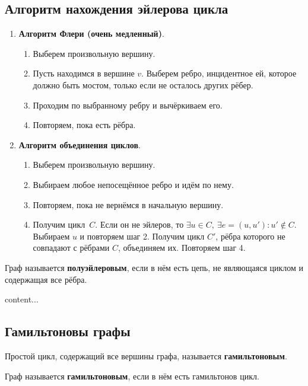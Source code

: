 \subsection{Алгоритм нахождения эйлерова цикла}
\begin{enumerate}
\item \textbf{Алгоритм Флери (очень медленный)}.
\begin{enumerate}
	\item Выберем произвольную вершину.
	\item Пусть находимся в вершине $v$. Выберем ребро, инцидентное ей, которое должно быть мостом, только если не осталось других рёбер.
	\item Проходим по выбранному ребру и вычёркиваем его.
	\item Повторяем, пока есть рёбра.
\end{enumerate}
\item \textbf{Алгоритм объединения циклов}.
\begin{enumerate}
	\item Выберем произвольную вершину.
	\item Выбираем любое непосещённое ребро и идём по нему.
	\item Повторяем, пока не вернёмся в начальную вершину.
	\item Получим цикл~$C$. Если он не эйлеров, то $\exists u \in C, \ \exists e = (u, u') \colon u' \notin C$. Выбираем $u$ и повторяем шаг 2. Получим цикл $C'$, рёбра которого не совпадают с рёбрами $C$, объединяем их. Повторяем шаг 4.
\end{enumerate}
\end{enumerate}


Граф называется \textbf{полуэйлеровым}, если в нём есть цепь, не являющаяся циклом и содержащая все рёбра.


\begin{theorem}
content...
\end{theorem}

\subsection{Гамильтоновы графы}

Простой цикл, содержащий все вершины графа, называется \textbf{гамильтоновым}.



Граф называется \textbf{гамильтоновым}, если в нём есть гамильтонов цикл.


